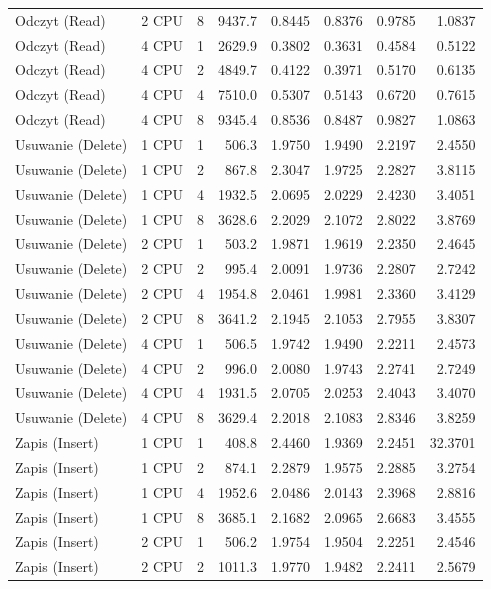 \begin{table}[ht]
{\begin{tabular}{llcrrrrr}
Odczyt (Read) & 2 CPU & 8 & 9437.7 & 0.8445 & 0.8376 & 0.9785 & 1.0837 \\
Odczyt (Read) & 4 CPU & 1 & 2629.9 & 0.3802 & 0.3631 & 0.4584 & 0.5122 \\
Odczyt (Read) & 4 CPU & 2 & 4849.7 & 0.4122 & 0.3971 & 0.5170 & 0.6135 \\
Odczyt (Read) & 4 CPU & 4 & 7510.0 & 0.5307 & 0.5143 & 0.6720 & 0.7615 \\
Odczyt (Read) & 4 CPU & 8 & 9345.4 & 0.8536 & 0.8487 & 0.9827 & 1.0863 \\
Usuwanie (Delete) & 1 CPU & 1 & 506.3 & 1.9750 & 1.9490 & 2.2197 & 2.4550 \\
Usuwanie (Delete) & 1 CPU & 2 & 867.8 & 2.3047 & 1.9725 & 2.2827 & 3.8115 \\
Usuwanie (Delete) & 1 CPU & 4 & 1932.5 & 2.0695 & 2.0229 & 2.4230 & 3.4051 \\
Usuwanie (Delete) & 1 CPU & 8 & 3628.6 & 2.2029 & 2.1072 & 2.8022 & 3.8769 \\
Usuwanie (Delete) & 2 CPU & 1 & 503.2 & 1.9871 & 1.9619 & 2.2350 & 2.4645 \\
Usuwanie (Delete) & 2 CPU & 2 & 995.4 & 2.0091 & 1.9736 & 2.2807 & 2.7242 \\
Usuwanie (Delete) & 2 CPU & 4 & 1954.8 & 2.0461 & 1.9981 & 2.3360 & 3.4129 \\
Usuwanie (Delete) & 2 CPU & 8 & 3641.2 & 2.1945 & 2.1053 & 2.7955 & 3.8307 \\
Usuwanie (Delete) & 4 CPU & 1 & 506.5 & 1.9742 & 1.9490 & 2.2211 & 2.4573 \\
Usuwanie (Delete) & 4 CPU & 2 & 996.0 & 2.0080 & 1.9743 & 2.2741 & 2.7249 \\
Usuwanie (Delete) & 4 CPU & 4 & 1931.5 & 2.0705 & 2.0253 & 2.4043 & 3.4070 \\
Usuwanie (Delete) & 4 CPU & 8 & 3629.4 & 2.2018 & 2.1083 & 2.8346 & 3.8259 \\
Zapis (Insert) & 1 CPU & 1 & 408.8 & 2.4460 & 1.9369 & 2.2451 & 32.3701 \\
Zapis (Insert) & 1 CPU & 2 & 874.1 & 2.2879 & 1.9575 & 2.2885 & 3.2754 \\
Zapis (Insert) & 1 CPU & 4 & 1952.6 & 2.0486 & 2.0143 & 2.3968 & 2.8816 \\
Zapis (Insert) & 1 CPU & 8 & 3685.1 & 2.1682 & 2.0965 & 2.6683 & 3.4555 \\
Zapis (Insert) & 2 CPU & 1 & 506.2 & 1.9754 & 1.9504 & 2.2251 & 2.4546 \\
Zapis (Insert) & 2 CPU & 2 & 1011.3 & 1.9770 & 1.9482 & 2.2411 & 2.5679 \\

\end{tabular}}
\end{table}
